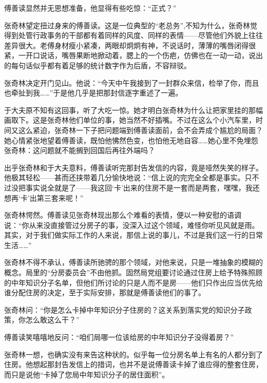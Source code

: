 \par 傅善读显然并无思想准备，他显得有些吃惊：“正式？”
\par 张奇林望定扭过身来的傅善读。这是一位典型的“老总务”,不知为什么，张奇林觉得到处管行政事务的干部都有着同样的风度、同样的表情——尽管他们外貌上往往差异很大。老傅身材瘦小紧凑，两眼却炯炯有神，不说话时，薄薄的嘴唇闭得很紧，一开口说话，嘴唇果断地掀动着，腮上的一个伤疤，仿佛也在一动一动，说出的每句话似乎都有着足够的统计数字作为后盾，不容辩驳。
\par 张奇林决定开门见山。他说：“今天中午我接到了一封群众来信，检举了你，而且也牵扯到我……”于是他几乎是把那封信逐字重述了一遍。
\par 于大夫原不知有这回事，听了大吃一惊。她才明白张奇林为什么让把家里挂的那幅画取下。这是张奇林他们单位的事，她当然不好插嘴。不过在这么个小汽车里，时间又这么紧迫，张奇林一下子把问题端到傅善读面前，会不会弄成个尴尬的局面？她心情紧张地望着傅善读，既怕他怫然色变，也怕他无地自容……她心里不免埋怨张奇林：这问题就不能搁到回国后再往外端吗？
\par 出乎张奇林和于大夫意料，傅善读听完那封告发信的内容，竟是哑然失笑的样子。他极其轻松——甚而还挟带着几分愉快地说：“信上说的完完全全都是事实。只不过没把事实说全就是了——我这回‘卡’出来的住房不是一套而是两套，嘿嘿，我还想再‘卡’出第三套来呢！”
\par 张奇林愕然。傅善读见张奇林现出那么个难看的表情，便以一种安慰的语调说：“你从来没直接管过分房子的事，没深入过这个领域，难怪你听见风就是雨。其实，对于我们做实际工作的人来说，那信上说的事儿，不过是我们这一行的日常生活……”
\par 张奇林不得不承认，傅善读所驰骋的那个领域，对他来说，只是一堆抽象的模糊的概念。局里的“分房委员会”不由他抓。固然局党组要讨论通过住房上给予特殊照顾的中年知识分子名单，但他们所讨论的只是人而不是房——他们只作出应当优先给谁分配住房的决定，至于实际安排，那就是傅善读他们的事了。
\par 张奇林问：“你是怎么卡掉中年知识分子住房的？这关系到落实党的知识分子政策，你怎么敢这么干？”
\par 傅善读笑嘻嘻地反问：“咱们局哪一位该给房的中年知识分子没得着房？”
\par 张奇林一想，也确实没有来告这种状的。似乎每一位分房名单上有名的人都分到了住房。他想起那封告发信上的措词，也并不是说傅善读卡掉了谁应得的整套住房，而只是说他“卡掉了您局中年知识分子的居住面积”。

